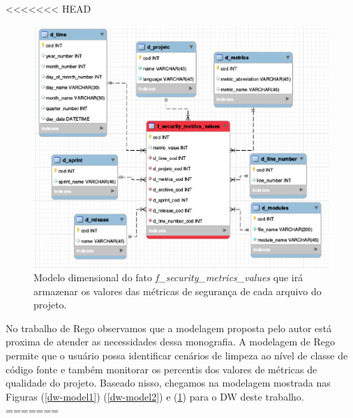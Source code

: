  
<<<<<<< HEAD

 \begin{figure}[H]
 	\centering
 		\includegraphics[scale=0.5]{figuras/dw-fato-security-metrics}
 		\caption{Modelo dimensional do fato \emph{f\_security\_metrics\_values} que irá armazenar os valores das métricas de segurança de cada arquivo do projeto.}
 		\label{dw-model3}
 \end{figure}

 

No trabalho de Rego \citeyear{rego2014} observamos que a modelagem proposta pelo autor está proxima de atender as necessidades dessa monografia. A modelagem de Rego \citeyear{rego2014} permite que o usuário possa identificar cenários de limpeza ao nível de classe de código fonte e também monitorar os percentis dos valores de métricas de qualidade do projeto. Baseado nisso, chegamos na modelagem mostrada nas Figuras (\ref{dw-model1}) (\ref{dw-model2}) e (\ref{dw-model3}) para o DW deste trabalho.
=======

